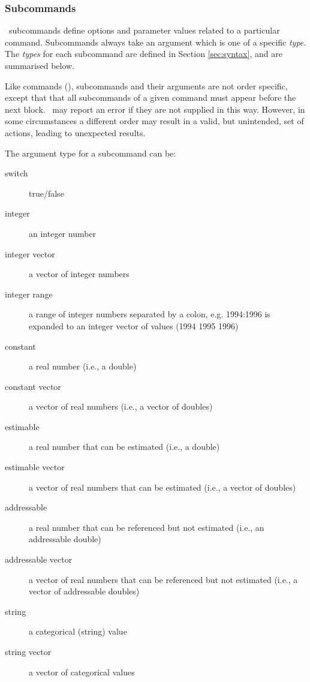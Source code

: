 \subsubsection{Subcommands}

\CNAME\ subcommands define options and parameter values related to a particular command. Subcommands always take an argument which is one of a specific \emph{type}. The \emph{types} for each subcommand are defined in Section \ref{sec:syntax}, and are summarised below.

Like commands (), subcommands and their arguments are not order specific, except that that all subcommands of a given command must appear before the next  block. \CNAME\ may report an error if they are not supplied in this way. However, in some circumstances a different order may result in a valid, but unintended, set of actions, leading to unexpected results.

The argument type for a subcommand can be:

\begin{description}
    \item[switch] true/false
    \item[integer] an integer number
	\item[integer vector] a vector of integer numbers
	\item[integer range] a range of integer numbers separated by a colon, e.g. 1994:1996 is expanded to an integer vector of values (1994 1995 1996)
	\item[constant] a real number (i.e., a double)
	\item[constant vector] a vector of real numbers (i.e., a vector of doubles)
	\item[estimable] a real number that can be estimated (i.e., a double)
	\item[estimable vector] a vector of real numbers that can be estimated (i.e., a vector of doubles)
	\item[addressable] a real number that can be referenced but not estimated (i.e., an addressable double)
	\item[addressable vector] a vector of real numbers that can be referenced but not estimated (i.e., a vector of addressable doubles)
	\item[string] a categorical (string) value
	\item[string vector] a vector of categorical values
\end{description}

